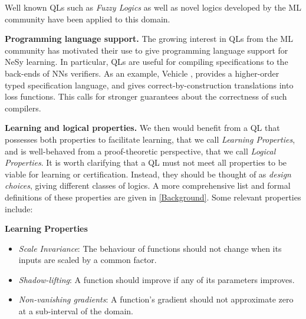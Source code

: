 Well known QLs such as \textit{Fuzzy Logics} \citep{cintula2011handbook} as well as novel logics developed by the ML community \citep{serafini2016logic, varnai2020robustness, fischer2019dl2} have been applied to this domain.



\textbf{Programming language support.} The growing interest in QLs from the ML community has motivated their use to give programming language support for NeSy learning. In particular, QLs are useful for compiling specifications to the back-ends of NNs verifiers. As an example, Vehicle \citep{vehicle}, provides a higher-order typed specification language, and gives correct-by-construction translations into loss functions. This calls for stronger guarantees about the correctness of such compilers.




\textbf{Learning and logical properties.} We then would benefit from a QL that possesses both properties to facilitate learning, that we call \textit{Learning Properties}, and is well-behaved from a proof-theoretic perspective, that we call \textit{Logical Properties}. It is worth clarifying that a QL must not meet all  properties to be viable for learning or certification. Instead, they should be thought of as \textit{design choices}, giving different classes of logics. A more comprehensive list and formal definitions of these properties are given in \cref{Background}. Some relevant properties include:

\textbf{Learning Properties}
\begin{itemize}
\item \textit{Scale Invariance}: The behaviour of functions should not change when its inputs are scaled by a common factor.
\item \textit{Shadow-lifting}: A function should improve if any of its parameters improves.
\item \textit{Non-vanishing gradients}: A function's gradient should not approximate zero at a sub-interval of the domain.
\end{itemize}

